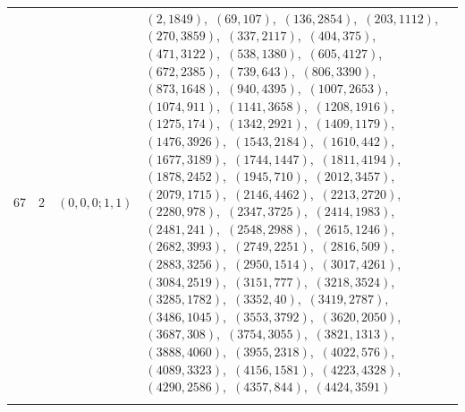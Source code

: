 \documentclass[11pt]{article}
\begin{document}
\begin{longtable}{@{}rrl>{\raggedright\arraybackslash}p{}@{}}
67 & 2 & $(0,0,0;1,1)$ & $(2,1849)$,\allowbreak\ $(69,107)$,\allowbreak\ $(136,2854)$,\allowbreak\ $(203,1112)$,\allowbreak\ $(270,3859)$,\allowbreak\ $(337,2117)$,\allowbreak\ $(404,375)$,\allowbreak\ $(471,3122)$,\allowbreak\ $(538,1380)$,\allowbreak\ $(605,4127)$,\allowbreak\ $(672,2385)$,\allowbreak\ $(739,643)$,\allowbreak\ $(806,3390)$,\allowbreak\ $(873,1648)$,\allowbreak\ $(940,4395)$,\allowbreak\ $(1007,2653)$,\allowbreak\ $(1074,911)$,\allowbreak\ $(1141,3658)$,\allowbreak\ $(1208,1916)$,\allowbreak\ $(1275,174)$,\allowbreak\ $(1342,2921)$,\allowbreak\ $(1409,1179)$,\allowbreak\ $(1476,3926)$,\allowbreak\ $(1543,2184)$,\allowbreak\ $(1610,442)$,\allowbreak\ $(1677,3189)$,\allowbreak\ $(1744,1447)$,\allowbreak\ $(1811,4194)$,\allowbreak\ $(1878,2452)$,\allowbreak\ $(1945,710)$,\allowbreak\ $(2012,3457)$,\allowbreak\ $(2079,1715)$,\allowbreak\ $(2146,4462)$,\allowbreak\ $(2213,2720)$,\allowbreak\ $(2280,978)$,\allowbreak\ $(2347,3725)$,\allowbreak\ $(2414,1983)$,\allowbreak\ $(2481,241)$,\allowbreak\ $(2548,2988)$,\allowbreak\ $(2615,1246)$,\allowbreak\ $(2682,3993)$,\allowbreak\ $(2749,2251)$,\allowbreak\ $(2816,509)$,\allowbreak\ $(2883,3256)$,\allowbreak\ $(2950,1514)$,\allowbreak\ $(3017,4261)$,\allowbreak\ $(3084,2519)$,\allowbreak\ $(3151,777)$,\allowbreak\ $(3218,3524)$,\allowbreak\ $(3285,1782)$,\allowbreak\ $(3352,40)$,\allowbreak\ $(3419,2787)$,\allowbreak\ $(3486,1045)$,\allowbreak\ $(3553,3792)$,\allowbreak\ $(3620,2050)$,\allowbreak\ $(3687,308)$,\allowbreak\ $(3754,3055)$,\allowbreak\ $(3821,1313)$,\allowbreak\ $(3888,4060)$,\allowbreak\ $(3955,2318)$,\allowbreak\ $(4022,576)$,\allowbreak\ $(4089,3323)$,\allowbreak\ $(4156,1581)$,\allowbreak\ $(4223,4328)$,\allowbreak\ $(4290,2586)$,\allowbreak\ $(4357,844)$,\allowbreak\ $(4424,3591)$\\
\addlinespace[3pt]

\end{longtable}
\end{document}

